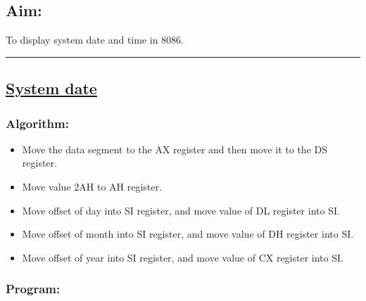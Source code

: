 \documentclass[10pt,a4paper]{article}
\begin{document}
\begin{flushleft}
\subsection*{\textbf{Aim:}} 
To display system date and time in 8086.

\vspace{1cm}
\hrule
\subsection*{\textbf{\underline{System date}}}

\subsubsection*{\textbf{Algorithm:}}
\begin{itemize}
    \item Move the data segment to the AX register and then move it to the DS register.
    \item Move value 2AH to AH register.
    \item Move offset of day into SI register, and move value of DL register into SI.
    \item Move offset of month into SI register, and move value of DH register into SI.
    \item Move offset of year into SI register, and move value of CX register into SI.
\end{itemize}

\newpage
\subsubsection*{\textbf{Program:}}


\end{flushleft}
\end{document}
